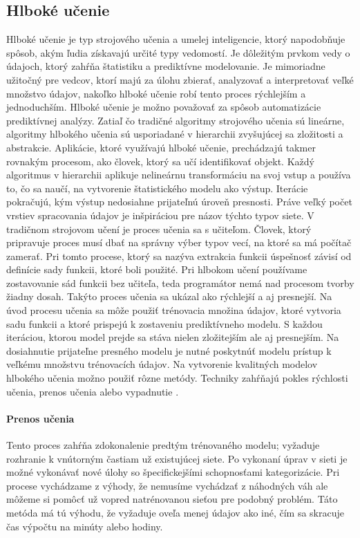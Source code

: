 \subsection{Hlboké učenie}
Hlboké učenie je typ strojového učenia a umelej inteligencie, ktorý napodobňuje spôsob, akým ľudia získavajú určité typy vedomostí. Je dôležitým prvkom vedy o údajoch, ktorý zahŕňa štatistiku a prediktívne modelovanie. Je mimoriadne užitočný pre vedcov, ktorí majú za úlohu zbierať, analyzovať a interpretovať veľké množstvo údajov, nakoľko hlboké učenie robí tento proces rýchlejším a jednoduchším.
Hlboké učenie je možno považovať za spôsob automatizácie prediktívnej analýzy. Zatiaľ čo tradičné algoritmy strojového učenia sú lineárne, algoritmy hlbokého učenia sú usporiadané v hierarchii zvyšujúcej sa zložitosti a abstrakcie.
Aplikácie, ktoré využívajú hlboké učenie, prechádzajú takmer rovnakým procesom, ako človek, ktorý sa učí identifikovať objekt. Každý algoritmus v hierarchii aplikuje nelineárnu transformáciu na svoj vstup a používa to, čo sa naučí, na vytvorenie štatistického modelu ako výstup. Iterácie pokračujú, kým výstup nedosiahne prijateľnú úroveň presnosti. Práve veľký počet vrstiev spracovania údajov je inšpiráciou pre názov týchto typov siete.
V tradičnom strojovom učení je proces učenia sa s učiteľom. Človek, ktorý pripravuje proces musí dbať na správny výber typov vecí, na ktoré sa má počítač zamerať. Pri tomto procese, ktorý sa nazýva extrakcia funkcii úspešnosť závisí od definície sady funkcii, ktoré boli použité. Pri hlbokom učení používame zostavovanie sád funkcii bez učiteľa, teda programátor nemá nad procesom tvorby žiadny dosah. Takýto proces učenia sa ukázal ako rýchlejší a aj presnejší.
Na úvod procesu učenia sa môže použiť trénovacia množina údajov, ktoré vytvoria sadu funkcii a ktoré prispejú k zostaveniu prediktívneho modelu. S každou iteráciou, ktorou model prejde sa stáva nielen zložitejším ale aj presnejším. Na dosiahnutie prijateľne presného modelu je nutné poskytnúť modelu prístup k veľkému množstvu trénovacích údajov.
Na vytvorenie kvalitných modelov hlbokého učenia možno použiť rôzne metódy. Techniky zahŕňajú pokles rýchlosti učenia, prenos učenia alebo vypadnutie \cite{deep_learning}.
\paragraph{Prenos učenia} Tento proces zahŕňa zdokonalenie predtým trénovaného modelu; vyžaduje rozhranie k vnútorným častiam už existujúcej siete. Po vykonaní úprav v sieti je možné vykonávať nové úlohy so špecifickejšími schopnosťami kategorizácie. Pri procese vychádzame z výhody, že nemusíme vychádzať z náhodných váh ale môžeme si pomôcť už vopred natrénovanou sieťou pre podobný problém. Táto metóda má tú výhodu, že vyžaduje oveľa menej údajov ako iné, čím sa skracuje čas výpočtu na minúty alebo hodiny.


